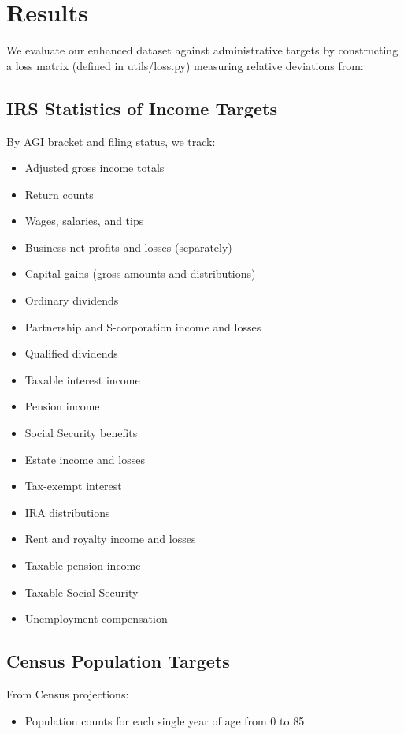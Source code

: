 \section{Results}

We evaluate our enhanced dataset against administrative targets by constructing a loss matrix (defined in utils/loss.py) measuring relative deviations from:

\subsection{IRS Statistics of Income Targets}

By AGI bracket and filing status, we track:
\begin{itemize}
    \item Adjusted gross income totals
    \item Return counts
    \item Wages, salaries, and tips
    \item Business net profits and losses (separately)
    \item Capital gains (gross amounts and distributions)
    \item Ordinary dividends
    \item Partnership and S-corporation income and losses
    \item Qualified dividends
    \item Taxable interest income
    \item Pension income
    \item Social Security benefits
    \item Estate income and losses
    \item Tax-exempt interest
    \item IRA distributions
    \item Rent and royalty income and losses
    \item Taxable pension income
    \item Taxable Social Security
    \item Unemployment compensation
\end{itemize}

\subsection{Census Population Targets}

From Census projections:
\begin{itemize}
    \item Population counts for each single year of age from 0 to 85
\end{itemize}

